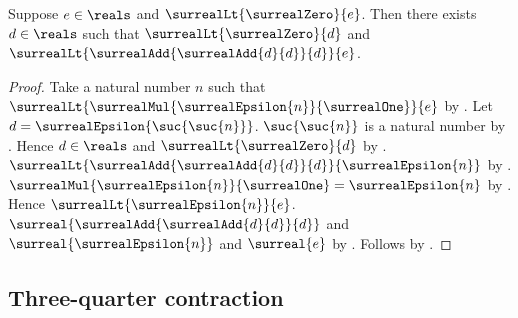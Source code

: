 \begin{theorem}\label{positive_real_has_threefold_dyadic_budget}
    Suppose $e\in\reals$ and $\surrealLt{\surrealZero}{e}$.
    Then there exists $d\in\reals$ such that
        $\surrealLt{\surrealZero}{d}$ and
        $\surrealLt{\surrealAdd{\surrealAdd{d}{d}}{d}}{e}$.
\end{theorem}
\begin{proof}
    Take a natural number $n$ such that
        $\surrealLt{\surrealMul{\surrealEpsilon{n}}{\surrealOne}}{e}$
        by
        .
    Let $d=\surrealEpsilon{\suc{\suc{n}}}$.
    $\suc{\suc{n}}$ is a natural number by .
    Hence $d\in\reals$ and $\surrealLt{\surrealZero}{d}$
        by .
    $\surrealLt{\surrealAdd{\surrealAdd{d}{d}}{d}}
        {\surrealEpsilon{n}}$
        by .
    $\surrealMul{\surrealEpsilon{n}}{\surrealOne}
        =\surrealEpsilon{n}$
        by .
    Hence $\surrealLt{\surrealEpsilon{n}}{e}$.
    $\surreal{\surrealAdd{\surrealAdd{d}{d}}{d}}$ and
        $\surreal{\surrealEpsilon{n}}$ and $\surreal{e}$
        by
        .
    Follows by .
\end{proof}

\subsection{Three-quarter contraction}

